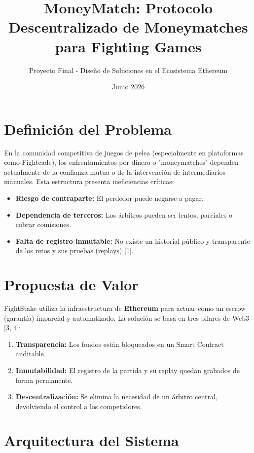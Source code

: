 \documentclass[twocolumn, 10pt]{article}
\title{\textbf{MoneyMatch: Protocolo Descentralizado de Moneymatches para Fighting Games}}
\author{Proyecto Final - Diseño de Soluciones en el Ecosistema Ethereum}
\date{Junio 2026}
\begin{document}
\maketitle

\section{Definición del Problema}
En la comunidad competitiva de juegos de pelea (especialmente en plataformas como Fightcade), los enfrentamientos por dinero o "moneymatches" dependen actualmente de la confianza mutua o de la intervención de intermediarios manuales. Esta estructura presenta ineficiencias críticas: 
\begin{itemize}
    \item \textbf{Riesgo de contraparte:} El perdedor puede negarse a pagar.
    \item \textbf{Dependencia de terceros:} Los árbitros pueden ser lentos, parciales o cobrar comisiones.
    \item \textbf{Falta de registro inmutable:} No existe un historial público y transparente de los retos y sus pruebas (replays) [1].
\end{itemize}

\section{Propuesta de Valor}
FightStake utiliza la infraestructura de \textbf{Ethereum} para actuar como un escrow (garantía) imparcial y automatizado. La solución se basa en tres pilares de Web3 [3, 4]:
\begin{enumerate}
    \item \textbf{Transparencia:} Los fondos están bloqueados en un Smart Contract auditable.
    \item \textbf{Inmutabilidad:} El registro de la partida y su replay quedan grabados de forma permanente.
    \item \textbf{Descentralización:} Se elimina la necesidad de un árbitro central, devolviendo el control a los competidores.
\end{enumerate}

\section{Arquitectura del Sistema}
\end{document}
